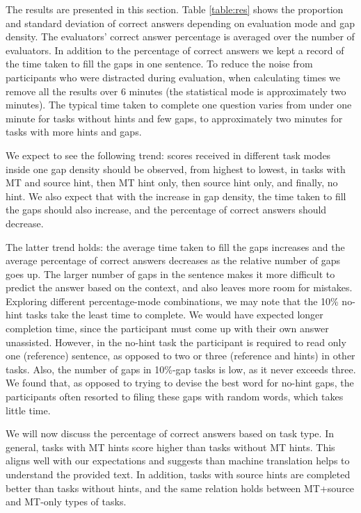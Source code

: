 \documentclass[11pt]{article}
\begin{document}
The results are presented in this section. Table \ref{table:res} 
shows
the proportion and standard deviation of correct answers depending on evaluation mode and gap density.
The evaluators' correct answer percentage is averaged over the number of evaluators. In addition to the percentage of correct answers we kept a record of the time taken to fill the gaps in one sentence. To reduce the noise from participants who were distracted during evaluation, when
calculating times we remove all the results over 6 minutes (the statistical mode is approximately
two minutes). The typical time taken to complete one question varies from under one minute for tasks without hints and few gaps, to approximately two minutes for tasks with more hints and gaps. 

We expect to see the following trend: scores received in different task modes inside one gap density should be observed, from highest to lowest, in tasks with MT and source hint, then MT hint only, then source hint only, and finally, no hint. We also expect that with the increase in gap density, the time taken to fill the gaps should also increase, and the percentage of correct answers should decrease. 

The latter trend holds: the average time taken to fill the gaps increases and the average percentage of correct answers decreases as the relative number of gaps goes up. The larger number of gaps in the sentence makes it more
difficult to predict the answer based on the context, and also leaves more room for
mistakes. Exploring different percentage-mode combinations, we may note that the 10\% no-hint tasks take the least time to complete. We would have expected longer completion time, since the participant must come up with their own answer unassisted. However, in the no-hint task the participant is required to read only one (reference) sentence, as opposed to two or three (reference and hints) in other tasks. Also, the number of gaps in 10\%-gap tasks is low, as it never exceeds three. We found that, as opposed to trying to devise the best word for no-hint gaps, the participants often resorted to filing these gaps with random words, which takes little time.

We will now discuss the percentage of correct answers based on task type. In general, tasks with MT hints score higher than tasks without MT hints. This aligns well with our expectations and suggests than machine translation helps to understand the provided text. In addition, tasks with source hints are completed better than tasks without hints, and the same relation holds between MT+source and MT-only types of tasks. 
\end{document}
